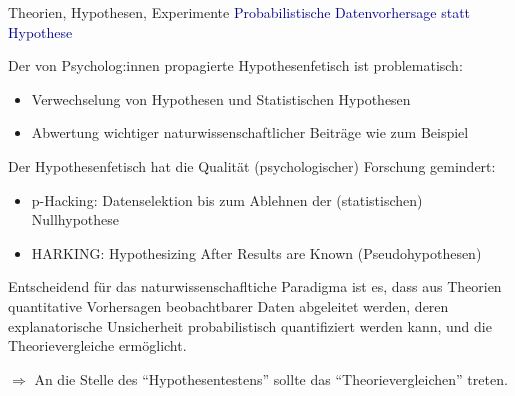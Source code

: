 \documentclass[
  8pt,
  ignorenonframetext,
]{beamer}
\providecommand{\tightlist}{%
  \setlength{\itemsep}{0pt}\setlength{\parskip}{0pt}}
\begin{document}
\begin{frame}{Theorien, Hypothesen, Experimente}
\protect\hypertarget{theorien-hypothesen-experimente-4}{}
\textcolor{darkblue}{Probabilistische Datenvorhersage statt Hypothese}
\small {}

Der von Psycholog:innen propagierte Hypothesenfetisch ist problematisch:

\begin{itemize}
\item Verwechselung von Hypothesen und Statistischen Hypothesen
\item Abwertung wichtiger naturwissenschaftlicher Beiträge wie zum Beispiel
\begin{itemize}
\end{itemize}
\end{itemize}

Der Hypothesenfetisch hat die Qualität (psychologischer) Forschung
gemindert:

\begin{itemize}
\tightlist
\item
  p-Hacking: Datenselektion bis zum Ablehnen der (statistischen)
  Nullhypothese
\item
  HARKING: Hypothesizing After Results are Known (Pseudohypothesen)
\end{itemize}

Entscheidend für das naturwissenschafltiche Paradigma ist es, dass aus
Theorien quantitative Vorhersagen beobachtbarer Daten abgeleitet werden,
deren explanatorische Unsicherheit probabilistisch quantifiziert werden
kann, und die Theorievergleiche ermöglicht.

\(\Rightarrow\) An die Stelle des ``Hypothesentestens'' sollte das
``Theorievergleichen'' treten.
\end{frame}
\end{document}
